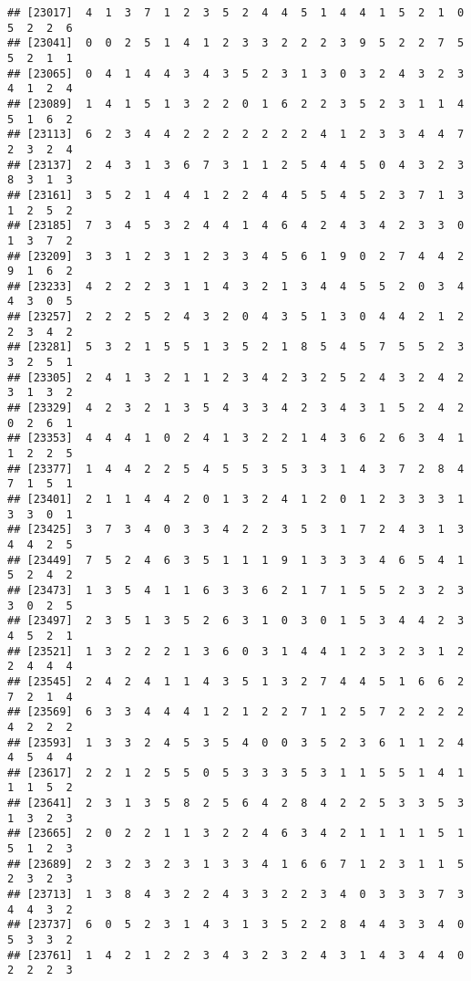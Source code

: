 \documentclass[
]{article}
\begin{document}
\begin{verbatim}
## [23017]  4  1  3  7  1  2  3  5  2  4  4  5  1  4  4  1  5  2  1  0  5  2  2  6
## [23041]  0  0  2  5  1  4  1  2  3  3  2  2  2  3  9  5  2  2  7  5  5  2  1  1
## [23065]  0  4  1  4  4  3  4  3  5  2  3  1  3  0  3  2  4  3  2  3  4  1  2  4
## [23089]  1  4  1  5  1  3  2  2  0  1  6  2  2  3  5  2  3  1  1  4  5  1  6  2
## [23113]  6  2  3  4  4  2  2  2  2  2  2  2  4  1  2  3  3  4  4  7  2  3  2  4
## [23137]  2  4  3  1  3  6  7  3  1  1  2  5  4  4  5  0  4  3  2  3  8  3  1  3
## [23161]  3  5  2  1  4  4  1  2  2  4  4  5  5  4  5  2  3  7  1  3  1  2  5  2
## [23185]  7  3  4  5  3  2  4  4  1  4  6  4  2  4  3  4  2  3  3  0  1  3  7  2
## [23209]  3  3  1  2  3  1  2  3  3  4  5  6  1  9  0  2  7  4  4  2  9  1  6  2
## [23233]  4  2  2  2  3  1  1  4  3  2  1  3  4  4  5  5  2  0  3  4  4  3  0  5
## [23257]  2  2  2  5  2  4  3  2  0  4  3  5  1  3  0  4  4  2  1  2  2  3  4  2
## [23281]  5  3  2  1  5  5  1  3  5  2  1  8  5  4  5  7  5  5  2  3  3  2  5  1
## [23305]  2  4  1  3  2  1  1  2  3  4  2  3  2  5  2  4  3  2  4  2  3  1  3  2
## [23329]  4  2  3  2  1  3  5  4  3  3  4  2  3  4  3  1  5  2  4  2  0  2  6  1
## [23353]  4  4  4  1  0  2  4  1  3  2  2  1  4  3  6  2  6  3  4  1  1  2  2  5
## [23377]  1  4  4  2  2  5  4  5  5  3  5  3  3  1  4  3  7  2  8  4  7  1  5  1
## [23401]  2  1  1  4  4  2  0  1  3  2  4  1  2  0  1  2  3  3  3  1  3  3  0  1
## [23425]  3  7  3  4  0  3  3  4  2  2  3  5  3  1  7  2  4  3  1  3  4  4  2  5
## [23449]  7  5  2  4  6  3  5  1  1  1  9  1  3  3  3  4  6  5  4  1  5  2  4  2
## [23473]  1  3  5  4  1  1  6  3  3  6  2  1  7  1  5  5  2  3  2  3  3  0  2  5
## [23497]  2  3  5  1  3  5  2  6  3  1  0  3  0  1  5  3  4  4  2  3  4  5  2  1
## [23521]  1  3  2  2  2  1  3  6  0  3  1  4  4  1  2  3  2  3  1  2  2  4  4  4
## [23545]  2  4  2  4  1  1  4  3  5  1  3  2  7  4  4  5  1  6  6  2  7  2  1  4
## [23569]  6  3  3  4  4  4  1  2  1  2  2  7  1  2  5  7  2  2  2  2  4  2  2  2
## [23593]  1  3  3  2  4  5  3  5  4  0  0  3  5  2  3  6  1  1  2  4  4  5  4  4
## [23617]  2  2  1  2  5  5  0  5  3  3  3  5  3  1  1  5  5  1  4  1  1  1  5  2
## [23641]  2  3  1  3  5  8  2  5  6  4  2  8  4  2  2  5  3  3  5  3  1  3  2  3
## [23665]  2  0  2  2  1  1  3  2  2  4  6  3  4  2  1  1  1  1  5  1  5  1  2  3
## [23689]  2  3  2  3  2  3  1  3  3  4  1  6  6  7  1  2  3  1  1  5  2  3  2  3
## [23713]  1  3  8  4  3  2  2  4  3  3  2  2  3  4  0  3  3  3  7  3  4  4  3  2
## [23737]  6  0  5  2  3  1  4  3  1  3  5  2  2  8  4  4  3  3  4  0  5  3  3  2
## [23761]  1  4  2  1  2  2  3  4  3  2  3  2  4  3  1  4  3  4  4  0  2  2  2  3

\end{verbatim}
\end{document}

